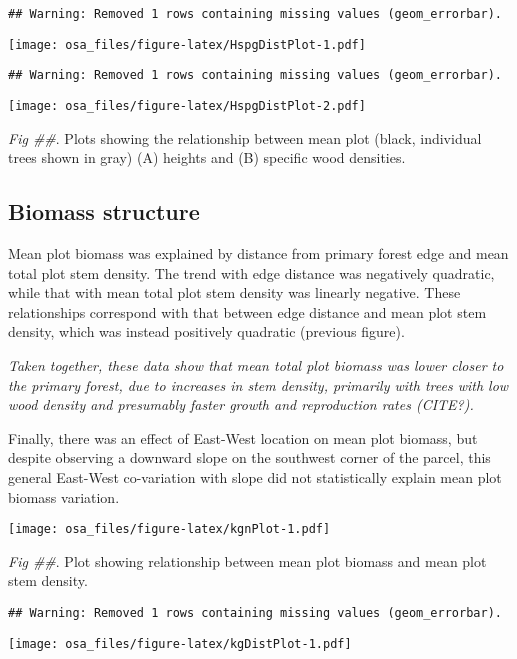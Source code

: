 \documentclass[]{article}
\begin{document}
\begin{verbatim}
## Warning: Removed 1 rows containing missing values (geom_errorbar).
\end{verbatim}

\texttt{[image: osa\_files/figure-latex/HspgDistPlot-1.pdf]}

\begin{verbatim}
## Warning: Removed 1 rows containing missing values (geom_errorbar).
\end{verbatim}

\texttt{[image: osa\_files/figure-latex/HspgDistPlot-2.pdf]}

\emph{Fig \#\#}. Plots showing the relationship between mean plot
(black, individual trees shown in gray) (A) heights and (B) specific
wood densities.

\hypertarget{biomass-structure}{%
\subsection{Biomass structure}\label{biomass-structure}}

Mean plot biomass was explained by distance from primary forest edge and
mean total plot stem density. The trend with edge distance was
negatively quadratic, while that with mean total plot stem density was
linearly negative. These relationships correspond with that between edge
distance and mean plot stem density, which was instead positively
quadratic (previous figure).

\emph{Taken together, these data show that mean total plot biomass was
lower closer to the primary forest, due to increases in stem density,
primarily with trees with low wood density and presumably faster growth
and reproduction rates (CITE?).}

Finally, there was an effect of East-West location on mean plot biomass,
but despite observing a downward slope on the southwest corner of the
parcel, this general East-West co-variation with slope did not
statistically explain mean plot biomass variation.

\texttt{[image: osa\_files/figure-latex/kgnPlot-1.pdf]}

\emph{Fig \#\#}. Plot showing relationship between mean plot biomass and
mean plot stem density.

\begin{verbatim}
## Warning: Removed 1 rows containing missing values (geom_errorbar).
\end{verbatim}

\texttt{[image: osa\_files/figure-latex/kgDistPlot-1.pdf]}
\end{document}
